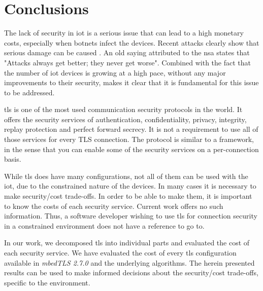 
\chapter{Conclusions}
\label{chapter:conclusions}

The lack of security in \gls{iot} is a serious issue that can lead to a high monetary costs,
especially when botnets infect the devices. Recent
attacks clearly show that serious damage can be caused \cite{sec17ant94:online}. An old saying attributed to the
\gls{nsa} states that "Attacks always get better; they never get worse".
Combined with the fact that the number of \gls{iot} devices is growing at a high
pace, without any major improvements to their security, makes it clear
that it is fundamental for this issue to be addressed.

\gls{tls} is one of the most used communication security protocols in the world. It offers the
security services of authentication, confidentiality, privacy, integrity, replay
protection and perfect forward secrecy. It is not a requirement to use all of
those services for every TLS connection. The protocol is similar to
a framework, in the sense that you can enable some of the security
services on a per-connection basis.

While \gls{tls} does have many configurations, not all of them can be used with the \gls{iot},
due to the constrained nature of the devices. In many cases it is necessary to make security/cost
trade-offs. In order to be able to make them, it is important to know the costs of each security
service. Current work offers no such information. Thus, a software developer wishing to use \gls{tls}
for connection security in a constrained environment does not have a reference to go to.

In our work, we decomposed \gls{tls} into individual parts and evaluated the cost of each security service.
We have evaluated the cost of every \gls{tls} configuration available in \textit{mbedTLS 2.7.0} and the underlying
algorithms. The herein presented results can be used to make informed decisions about the security/cost trade-offs,
specific to the environment.

